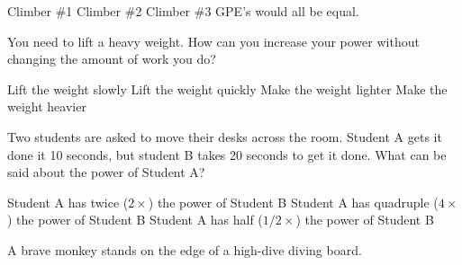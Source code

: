 \documentclass[answers]{exam}
\begin{document}
\begin{questions}
\begin{minipage}{0.4\textwidth}
    \begin{randomizechoices}[norandomize]
        \choice Climber \#1
        \choice Climber \#2
        \choice Climber \#3
        \correctchoice GPE's would all be equal.
    \end{randomizechoices}
\end{minipage}%
\begin{minipage}{0.5\textwidth}
    \centering
\end{minipage}

\clearpage

\question 
You need to lift a heavy weight. How can you increase your power without changing the amount of work you do?

\begin{randomizechoices}[norandomize]
    \choice Lift the weight slowly
    \correctchoice Lift the weight quickly
    \choice Make the weight lighter
    \choice Make the weight heavier
\end{randomizechoices}

\question
Two students are asked to move their desks across the room. Student A gets it done it 10 seconds, but student B takes 20 seconds to get it done. What can be said about the power of Student A?

\begin{randomizechoices}[norandomize]
    \correctchoice Student A has twice ($2\times$) the power of Student B
    \choice Student A has quadruple ($4\times$) the power of Student B
    \choice Student A has half ($1/2\times$) the power of Student B    
\end{randomizechoices}


\question
A brave monkey stands on the edge of a high-dive diving board.


\end{questions}
\end{document}

